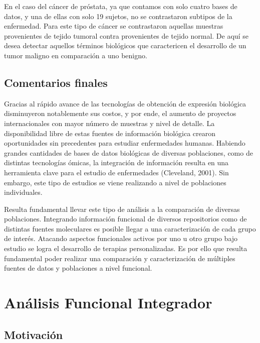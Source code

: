 \documentclass[12pt,twoside]{reedthesis}
\begin{document}
En el caso del cáncer de próstata, ya que contamos con solo cuatro bases de datos, y una de ellas con solo 19 sujetos, no se contrastaron subtipos de la enfermedad. Para este tipo de cáncer se contrastaron aquellas muestras provenientes de tejido tumoral contra provenientes de tejido normal. De aquí se desea detectar aquellos términos biológicos que caractericen el desarrollo de un tumor maligno en comparación a uno benigno.

\hypertarget{comentarios-finales-1}{%
\section{Comentarios finales}\label{comentarios-finales-1}}

Gracias al rápido avance de las tecnologías de obtención de expresión biológica disminuyeron notablemente sus costos, y por ende, el aumento de proyectos internacionales con mayor número de muestras y nivel de detalle. La disponibilidad libre de estas fuentes de información biológica crearon oportunidades sin precedentes para estudiar enfermedades humanas. Habiendo grandes cantidades de bases de datos biológicas de diversas poblaciones, como de distintas tecnologías ómicas, la integración de información resulta en una herramienta clave para el estudio de enfermedades (Cleveland, 2001). Sin embargo, este tipo de estudios se viene realizando a nivel de poblaciones individuales.

Resulta fundamental llevar este tipo de análisis a la comparación de diversas poblaciones. Integrando información funcional de diversos repositorios como de distintas fuentes moleculares es posible llegar a una caracterización de cada grupo de interés. Atacando aspectos funcionales activos por uno u otro grupo bajo estudio se logra el desarrollo de terapias personalizadas. Es por ello que resulta fundamental poder realizar una comparación y caracterización de múltiples fuentes de datos y poblaciones a nivel funcional.

\hypertarget{cap:ifa}{%
\chapter{Análisis Funcional Integrador}\label{cap:ifa}}

\hypertarget{motivaciuxf3n}{%
\section{Motivación}\label{motivaciuxf3n}}
\end{document}
